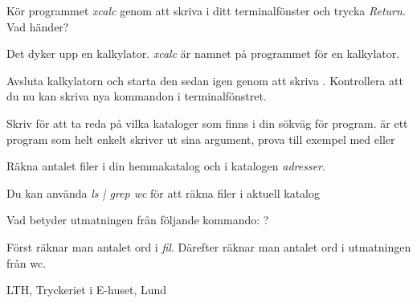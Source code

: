 \documentclass[a4paper,twocolumn]{book}
\begin{document}
\begin{exercise}
  Kör programmet \emph{xcalc} genom att skriva  i
  ditt terminalfönster och trycka \emph{Return}. Vad händer?
  \begin{answer}
    Det dyker upp en kalkylator. \emph{xcalc} är namnet på
    programmet för en kalkylator.
  \end{answer}
\end{exercise}
\begin{exercise}
  Avsluta kalkylatorn och starta den sedan
  igen genom att skriva . Kontrollera att du
  nu kan skriva nya kommandon i terminalfönstret.
\end{exercise}

\begin{exercise}
  Skriv  för att ta reda på vilka kataloger som finns i
  din sökväg för program.  är ett program som helt
  enkelt skriver ut sina argument, prova till exempel med
   eller 
\end{exercise}

\begin{exercise}
  Räkna antalet filer i din hemmakatalog och i katalogen \emph{adresser}.
  \begin{answer}
    Du kan använda \emph{ls | grep wc} för att räkna filer i aktuell katalog
  \end{answer}
\end{exercise}
\begin{exercise}
  Vad betyder utmatningen från följande kommando: 
  \mbox{}?
  \begin{answer}
    Först räknar man antalet ord i \emph{fil}. Därefter räknar man
    antalet ord i utmatningen från wc.
  \end{answer}
\end{exercise}



\appendix
\answers
\label{answers}

\onecolumn
\printindex

\cleardoublepage
\thispagestyle{empty}
\hbox{}
\newpage
\onecolumn
\thispagestyle{empty}
\hbox{}\vfill\noindent\small
\centerline{LTH, Tryckeriet i E-huset, Lund \number\year{}}
\end{document}
